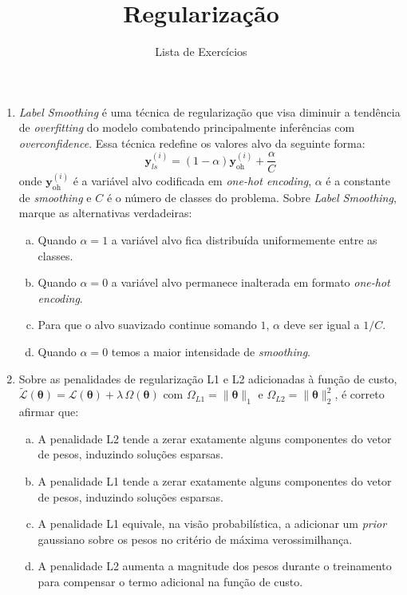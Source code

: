 \documentclass{dlproblemset}
\title{Regularização}
\subtitle{Lista de Exercícios}
\begin{document}
\begin{enumerate}[1)]

    \item \textit{Label Smoothing} é uma técnica de regularização que visa diminuir a tendência de \textit{overfitting} do modelo combatendo principalmente inferências com \textit{overconfidence}. Essa técnica redefine os valores alvo da seguinte forma:
    \begin{equation*}
     \mathbf{y}^{(i)}_{ls} = (1 - \alpha)\mathbf{y}^{(i)}_{\text{oh}} + \frac{\alpha}{C}
    \end{equation*}
    \noindent onde $\mathbf{y}^{(i)}_{\text{oh}}$ é a variável alvo codificada em \textit{one-hot encoding}, $\alpha$ é a constante de \textit{smoothing} e $C$ é o número de classes do problema. Sobre \textit{Label Smoothing}, marque as alternativas verdadeiras:

    \begin{enumerate}[(a)]
	    \item Quando $\alpha=1$ a variável alvo fica distribuída uniformemente entre as classes.
	    \item Quando $\alpha=0$ a variável alvo permanece inalterada em formato \textit{one-hot encoding}.
	    \item Para que o alvo suavizado continue somando $1$, $\alpha$ deve ser igual a $1/C$.
	    \item Quando $\alpha=0$ temos a maior intensidade de \textit{smoothing}.
    \end{enumerate}

    \item Sobre as penalidades de regularização L1 e L2 adicionadas à função de custo, $\tilde{\mathcal{L}}(\boldsymbol{\theta}) = \mathcal{L}(\boldsymbol{\theta}) + \lambda\,\Omega(\boldsymbol{\theta})$ com $\Omega_{L1} = \|\boldsymbol{\theta}\|_1$ e $\Omega_{L2} = \|\boldsymbol{\theta}\|_2^2$, é correto afirmar que:
    \begin{enumerate}[(a)]
        \item A penalidade L2 tende a zerar exatamente alguns componentes do vetor de pesos, induzindo soluções esparsas.
        \item A penalidade L1 tende a zerar exatamente alguns componentes do vetor de pesos, induzindo soluções esparsas.
        \item A penalidade L1 equivale, na visão probabilística, a adicionar um \textit{prior} gaussiano sobre os pesos no critério de máxima verossimilhança.
        \item A penalidade L2 aumenta a magnitude dos pesos durante o treinamento para compensar o termo adicional na função de custo.
    \end{enumerate}


\end{enumerate}
\end{document}
